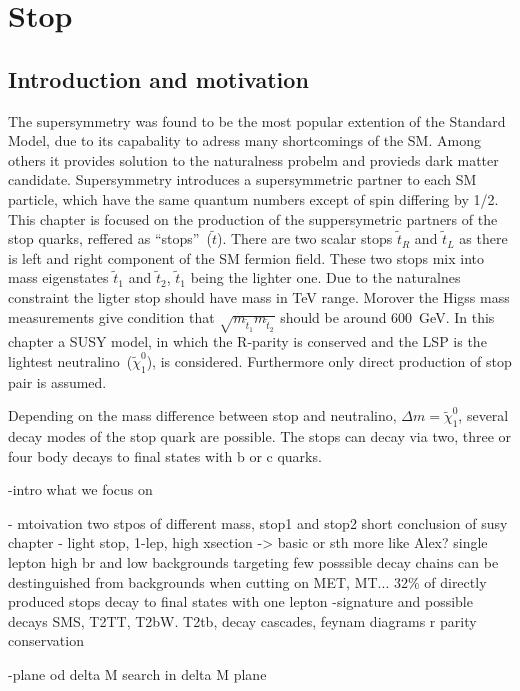 \chapter{Stop}

\section{Introduction and motivation}

The supersymmetry was found to be the most popular extention of the Standard Model, due to its capabality to adress many shortcomings of the SM. Among others it provides solution to the naturalness probelm and provieds dark matter candidate. Supersymmetry introduces a supersymmetric partner to each SM particle, which have the same quantum numbers except of spin differing by 1/2. This chapter is focused on the production of the suppersymetric partners of the stop quarks, reffered as ``stops''~($\tilde{t}$). There are two scalar stops $\tilde{t}_{R}$ and  $\tilde{t}_{L}$ as there is left and right component of the SM fermion field. These two stops mix into mass eigenstates $\tilde{t}_{1}$ and $\tilde{t}_{2}$,  $\tilde{t}_{1}$ being the lighter one. Due to the naturalnes constraint the ligter stop should have mass in TeV range. Morover the Higss mass measurements give condition that $\sqrt{m_{\tilde{t}_{1}} m_{\tilde{t}_{2}}}$ should be around 600~GeV. In this chapter a SUSY model, in which the R-parity is conserved and the LSP is the lightest neutralino~($\tilde{\chi}^{0}_{1}$), is considered. Furthermore only direct production of stop pair is assumed.

Depending on the mass difference between stop and neutralino, $\Delta m =  \tilde{\chi}^{0}_{1}$, several decay modes of the stop quark are possible. The stops can decay via two, three or four body decays to final states with b or c quarks.



-intro what we focus on

- mtoivation
	two stpos of different mass, stop1 and stop2
	short conclusion of susy chapter - light stop, 1-lep, high xsection -> basic or sth more like Alex?
	single lepton high br and low backgrounds
	targeting few posssible decay chains
	can be destinguished from backgrounds when cutting on MET, MT...
	32\% of directly produced stops decay to final states with one lepton
-signature  and possible decays
	SMS, T2TT, T2bW. T2tb, decay cascades, feynam diagrams
	r parity conservation
	

-plane od delta M
	search in delta M plane


